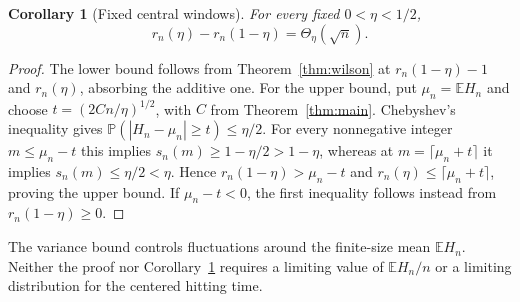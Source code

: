 \documentclass[11pt]{article}
\newtheorem{corollary}[theorem]{Corollary}
\theoremstyle{remark}
\newcommand{\Prb}{\mathbb P}
\newcommand{\E}{\mathbb E}
\numberwithin{equation}{section}
\begin{document}
\begin{corollary}[Fixed central windows]
\label{cor:window}
For every fixed $0<\eta<1/2$,
\[
 r_n(\eta)-r_n(1-\eta)=\Theta_\eta(\sqrt n).
\]
\end{corollary}

\begin{proof}
The lower bound follows from Theorem~\ref{thm:wilson} at
$r_n(1-\eta)-1$ and $r_n(\eta)$, absorbing the additive one.
For the upper bound, put $\mu_n=\E H_n$ and choose
$t=(2Cn/\eta)^{1/2}$, with $C$ from Theorem~\ref{thm:main}.
Chebyshev's inequality gives
$\Prb(|H_n-\mu_n|\ge t)\le\eta/2$.
For every nonnegative integer $m\le\mu_n-t$ this implies
$s_n(m)\ge1-\eta/2>1-\eta$, whereas at
$m=\lceil\mu_n+t\rceil$ it implies $s_n(m)\le\eta/2<\eta$.
Hence $r_n(1-\eta)>\mu_n-t$ and
$r_n(\eta)\le\lceil\mu_n+t\rceil$, proving the upper bound.
If $\mu_n-t<0$, the first inequality follows instead from
$r_n(1-\eta)\ge0$.
\end{proof}

The variance bound controls fluctuations around the finite-size mean
$\E H_n$. Neither the proof nor Corollary~\ref{cor:window} requires a
limiting value of $\E H_n/n$ or a limiting distribution for the
centered hitting time.



\end{document}
